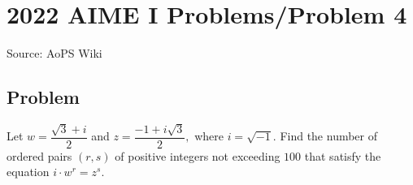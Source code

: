 \documentclass[12pt]{article}
\begin{document}
\section*{{2022 AIME I Problems/Problem 4}}
Source: AoPS Wiki

\subsection*{Problem}
Let $w = \dfrac{\sqrt{3} + i}{2}$ and $z = \dfrac{-1 + i\sqrt{3}}{2},$ where $i = \sqrt{-1}.$ Find the number of ordered pairs $(r,s)$ of positive integers not exceeding $100$ that satisfy the equation $i \cdot w^r = z^s.$
\end{document}
